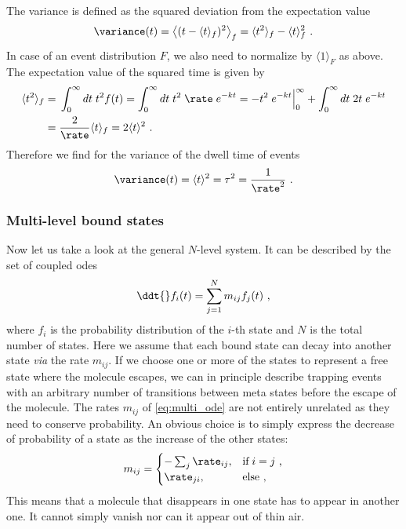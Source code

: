 The variance is defined as the squared deviation from the expectation value
%
\begin{align*}
    \variance(t) = \left\langle (t - \langle t\rangle_f)^2\right\rangle_f
                 = \langle t^2\rangle_f - \langle t\rangle_f^2
    \text{ .}
\end{align*}
%
In case of an event distribution $F$, we also need to normalize by $\langle 1\rangle_F$ as above.  The
expectation value of the squared time is given by
%
\begin{align*}
    \langle t^2\rangle_f ={}& \int_0^\infty dt\; t^2 f(t)
        = \int_0^\infty dt\; t^2 \; \rate\; e^{- kt}
        =  - t^2\; e^{-kt}\Big|_0^\infty + \int_0^\infty dt\; 2t\; e^{-kt}\\
        ={}&  \frac{2}{\rate} \langle t\rangle_f = 2\langle t\rangle^2
        \text{ .}
\end{align*}
%
Therefore we find for the variance of the dwell time of events
%
\begin{align*}
    \variance(t) = \langle t \rangle^2 = \tau^2 = \frac{1}{\rate^2}
    \text{ .}
\end{align*}
%


\subsubsection{Multi-level bound states}
%
\label{sec:trapping_appendix:multi_bound_state}

Now let us take a look at the general $N$-level system. It can be described by the set of coupled \glspl{ode}
%
\begin{align}\label{eq:multi_ode}
    \ddt{} f_i(t) = \sum_{j=1}^N m_{ij} f_j(t)
    \text{ ,}
\end{align}
%
where $f_i$ is the probability distribution of the $i$-th state and $N$ is the total number of states. Here we
assume that each bound state can decay into another state \textit{via} the rate $m_{ij}$. If we choose one or
more of the states to represent a free state where the molecule escapes, we can in principle describe trapping
events with an arbitrary number of transitions between meta states before the escape of the molecule. The
rates $m_{ij}$ of \cref{eq:multi_ode} are not entirely unrelated as they need to conserve probability. An
obvious choice is to simply express the decrease of probability of a state as the increase of the other
states:
%
\begin{align}\label{eq:matrix_elements}
    m_{ij} =
    \begin{cases}
        - \sum_j \rate_{ij}, & \text{if}\; i=j \text{ ,}\\
        \rate_{ji}, & \text{else} \text{ ,}
    \end{cases}
\end{align}
%
This means that a molecule that disappears in one state has to appear in another one. It cannot simply vanish
nor can it appear out of thin air.


